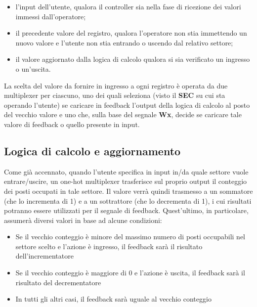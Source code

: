\documentclass[
  12pt,
  a4paper,
  headings=optiontoheadandtoc
]{scrreprt}
\begin{document}
\begin{itemize}
  \item l'input dell'utente, qualora il controller sia nella fase di ricezione dei valori immessi dall'operatore;
  \item il precedente valore del registro, qualora l'operatore non stia immettendo un nuovo valore e l'utente non stia entrando o uscendo dal relativo settore;
  \item il valore aggiornato dalla logica di calcolo qualora si sia verificato un ingresso o un'uscita.
\end{itemize}

La scelta del valore da fornire in ingresso a ogni registro è operata da due multiplexer per ciascuno, uno dei quali seleziona (visto il \textbf{SEC} su cui sta operando l'utente) se caricare in feedback l'output della logica di calcolo al posto del vecchio valore e uno che, sulla base del segnale \textbf{Wx}, decide se caricare tale valore di feedback o quello presente in input.

\subsection[nonumber=true]{Logica di calcolo e aggiornamento}

Come già accennato, quando l'utente specifica in input in/da quale settore vuole entrare/uscire, un one-hot multiplexer trasferisce sul proprio output il conteggio dei posti occupati in tale settore. Il valore verrà quindi trasmesso a un sommatore (che lo incrementa di 1) e a un sottrattore (che lo decrementa di 1), i cui risultati potranno essere utilizzati per il segnale di feedback. Quest'ultimo, in particolare, assumerà diversi valori in base ad alcune condizioni:

\begin{itemize}
  \item Se il vecchio conteggio è minore del massimo numero di posti occupabili nel settore scelto e l'azione è ingresso, il feedback sarà il risultato dell'incrementatore
  \item Se il vecchio conteggio è maggiore di 0 e l'azione è uscita, il feedback sarà il risultato del decrementatore
  \item In tutti gli altri casi, il feedback sarà uguale al vecchio conteggio
\end{itemize}
\end{document}
